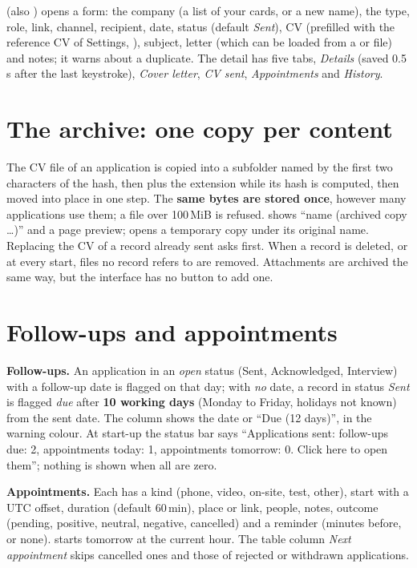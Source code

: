 \vspace{3pt}
 (also ) opens a form: the company (a list of
your cards, or a new name), the type, role, link, channel, recipient, date, status (default \emph{Sent}), CV
(prefilled with the reference CV of Settings, ), subject, letter (which can be loaded from a
 or  file) and notes; it warns about a duplicate. The detail has five tabs, \emph{Details} (saved
0.5\,s after the last keystroke), \emph{Cover letter}, \emph{CV sent}, \emph{Appointments} and \emph{History}.

\section{The archive: one copy per content}
The CV file of an application is copied into a  subfolder named by the first two characters of the hash, then  plus the extension
while its hash is computed, then moved into place in one step. The \textbf{same bytes are stored once},
however many applications use them; a file over 100\,MiB is refused.  shows ``name (archived copy
\ldots)'' and a page preview;  opens a temporary copy under its original name. Replacing the CV
of a record already sent asks first. When a record is deleted, or at every start, files no record refers to are
removed. Attachments are archived the same way, but the interface has no button to add one.

\section{Follow-ups and appointments}
\textbf{Follow-ups.} An application in an \emph{open} status (Sent, Acknowledged, Interview) with a follow-up
date is flagged on that day; with \emph{no} date, a record in status \emph{Sent} is flagged \emph{due} after
\textbf{10 working days} (Monday to Friday, holidays not known) from the sent date. The  column
shows the date or ``Due (12 days)'', in the warning colour. At start-up the status bar says ``Applications
sent: follow-ups due: 2, appointments today: 1, appointments tomorrow: 0. Click here to open them''; nothing is
shown when all are zero.

\textbf{Appointments.} Each has a kind (phone, video, on-site, test, other), start with a UTC offset, duration
(default 60\,min), place or link, people, notes, outcome (pending, positive, neutral, negative, cancelled) and a
reminder (minutes before, or none).  starts tomorrow at the current hour. The table column
\emph{Next appointment} skips cancelled ones and those of rejected or withdrawn applications.

